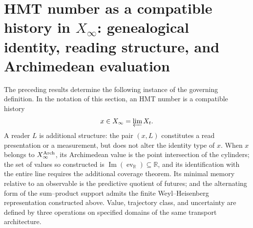 \section{HMT number as a compatible history in \(X_\infty\): genealogical identity,
reading structure, and Archimedean evaluation}

The preceding results determine the following instance of the governing definition.
In the notation of this section, an HMT number is a compatible
history
\[
x\in X_\infty=\varprojlim X_t.
\]
A reader \(L\) is additional structure: the pair \((x,L)\) constitutes a read presentation or a measurement, but does not alter the identity type of \(x\). When \(x\) belongs to \(X_\infty^{\rm Arch}\), its Archimedean value is the point intersection of the cylinders; the set of values so constructed is \(\operatorname{Im}(\operatorname{ev}_{\mathbb R})\subseteq\mathbb R\), and its identification with the entire line requires the additional coverage theorem. Its minimal memory relative to an observable is the predictive quotient of futures; and the alternating form of the sum--product support admits the finite Weyl--Heisenberg representation constructed above. Value, trajectory class, and uncertainty are defined by three operations on specified domains of the same transport architecture.
